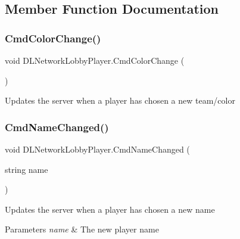 \subsection{Member Function Documentation}
\hypertarget{class_d_l_network_lobby_player_a53746df370122d632c01e627d97e2d4c}{}\label{class_d_l_network_lobby_player_a53746df370122d632c01e627d97e2d4c} 
\subsubsection{\texorpdfstring{Cmd\+Color\+Change()}{CmdColorChange()}}
{\footnotesize\ttfamily void D\+L\+Network\+Lobby\+Player.\+Cmd\+Color\+Change (\begin{DoxyParamCaption}{ }\end{DoxyParamCaption})}



Updates the server when a player has chosen a new team/color 

\hypertarget{class_d_l_network_lobby_player_a86e0dcdd5a6888bf43f1f9238d7ff3a1}{}\label{class_d_l_network_lobby_player_a86e0dcdd5a6888bf43f1f9238d7ff3a1} 
\subsubsection{\texorpdfstring{Cmd\+Name\+Changed()}{CmdNameChanged()}}
{\footnotesize\ttfamily void D\+L\+Network\+Lobby\+Player.\+Cmd\+Name\+Changed (\begin{DoxyParamCaption}\item[{string}]{name }\end{DoxyParamCaption})}



Updates the server when a player has chosen a new name 


\begin{DoxyParams}{Parameters}
{\em name} & The new player name\\
\hline
\end{DoxyParams}
\hypertarget{class_d_l_network_lobby_player_a9b88470749df360bb66ba670e3de7be1}{}\label{class_d_l_network_lobby_player_a9b88470749df360bb66ba670e3de7be1} 

